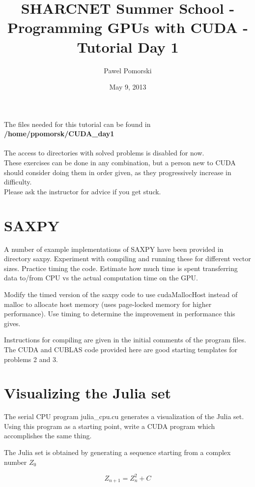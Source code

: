 \documentclass{article}
\begin{document}
\title{SHARCNET Summer School -  Programming GPUs with CUDA - Tutorial Day 1}
\author{Pawel Pomorski}
\date{May 9, 2013}

\maketitle


\noindent The files needed for this tutorial can be found in 
\\
{\bf /home/ppomorsk/CUDA\_day1} 
\\
\\The access to directories with solved problems is disabled for now.
\\
\noindent These exercises can be done in any combination, but a person new to CUDA
should consider doing them in order given, as they progressively increase in
difficulty.
\\
\noindent Please ask the instructor for advice if you get stuck.

\section{SAXPY}
A number of example implementations of SAXPY have been provided in directory saxpy. Experiment with compiling and running these for different vector sizes. Practice timing the code.  Estimate how much time is spent transferring data to/from CPU vs the actual computation time on the GPU. 

Modify the timed version of the saxpy code to use cudaMallocHost instead of malloc to allocate host memory (uses page-locked memory for higher performance).  Use timing to determine the improvement in performance this gives.

Instructions for compiling are given in the initial comments of the program files.
The CUDA and CUBLAS code provided here are good starting templates for problems 2 and 3.

\section{Visualizing the Julia set}
The serial CPU program julia\_cpu.cu generates a visualization of the Julia set.  Using this program as a starting point, write a CUDA program which accomplishes the same thing. 

The Julia set is obtained by generating a sequence starting from a complex number $Z_{0}$

\begin{equation}
Z_{n+1}=Z_{n}^2 + C  
\end{equation}
\end{document}

